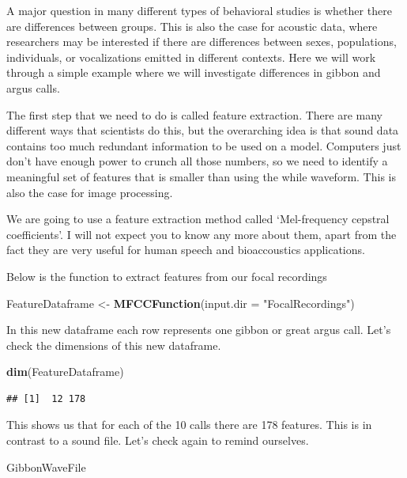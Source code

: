 \documentclass[]{book}
\newenvironment{Shaded}{\begin{snugshade}}{\end{snugshade}}
\newcommand{\DataTypeTok}[1]{\textcolor[rgb]{0.13,0.29,0.53}{#1}}
\newcommand{\KeywordTok}[1]{\textcolor[rgb]{0.13,0.29,0.53}{\textbf{#1}}}
\newcommand{\NormalTok}[1]{#1}
\newcommand{\StringTok}[1]{\textcolor[rgb]{0.31,0.60,0.02}{#1}}
\begin{document}
A major question in many different types of behavioral studies is whether there are differences between groups. This is also the case for acoustic data, where researchers may be interested if there are differences between sexes, populations, individuals, or vocalizations emitted in different contexts. Here we will work through a simple example where we will investigate differences in gibbon and argus calls.

The first step that we need to do is called feature extraction. There are many different ways that scientists do this, but the overarching idea is that sound data contains too much redundant information to be used on a model. Computers just don't have enough power to crunch all those numbers, so we need to identify a meaningful set of features that is smaller than using the while waveform. This is also the case for image processing.

We are going to use a feature extraction method called `Mel-frequency cepstral coefficients'. I will not expect you to know any more about them, apart from the fact they are very useful for human speech and bioaccoustics applications.

Below is the function to extract features from our focal recordings

\begin{Shaded}
\begin{Highlighting}[]
\NormalTok{FeatureDataframe <-}\StringTok{ }\KeywordTok{MFCCFunction}\NormalTok{(}\DataTypeTok{input.dir =} \StringTok{"FocalRecordings"}\NormalTok{)}
\end{Highlighting}
\end{Shaded}

In this new dataframe each row represents one gibbon or great argus call. Let's check the dimensions of this new dataframe.

\begin{Shaded}
\begin{Highlighting}[]
\KeywordTok{dim}\NormalTok{(FeatureDataframe)}
\end{Highlighting}
\end{Shaded}

\begin{verbatim}
## [1]  12 178
\end{verbatim}

This shows us that for each of the 10 calls there are 178 features. This is in contrast to a sound file. Let's check again to remind ourselves.

\begin{Shaded}
\begin{Highlighting}[]
\NormalTok{GibbonWaveFile}
\end{Highlighting}
\end{Shaded}
\end{document}
